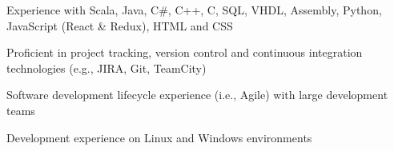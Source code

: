 \begin{cvitems}
\sectionspace
\sectionspace
\vspace{1mm}
	\fontsize{11pt}{1.2em}\bodyfontlight\upshape\color{text}
        \item {Experience with Scala, Java, C\#, C++, C, SQL, VHDL, Assembly, Python, JavaScript (React \& Redux), HTML and CSS}
        \item {Proficient in project tracking, version control and continuous integration technologies (e.g., JIRA, Git, TeamCity)}
        \item {Software development lifecycle experience (i.e., Agile) with large development teams}
        \item {Development experience on Linux and Windows environments}
        \end{cvitems}
\vspace{1mm}
\sectionspace